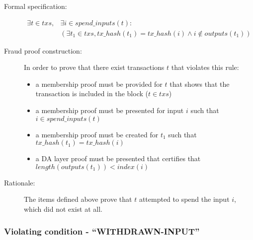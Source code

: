 \documentclass[../midgard.tex]{subfiles}
\begin{document}
\begin{description}

\item[Formal specification:]
\begin{equation*}
\begin{split}
    \exists t \in txs, &\exists i \in spend\_inputs(t): \\
    &( \exists t_1 \in txs, tx\_hash(t_1) = tx\_hash(i) \land i \notin outputs(t_1) )
\end{split}
\end{equation*}

\item[Fraud proof construction:] In order to prove that there exist transactions $t$ that violates this rule:
\begin{itemize}
    \item a membership proof must be provided for $t$ that shows that the transaction is included in the block ($t \in txs$)
    \item a membership proof must be presented for input $i$ such that $i \in spend\_inputs(t)$
    \item a membership proof must be created for $t_1$ such that $tx\_hash(t_1) = tx\_hash(i)$
    \item a DA layer proof must be presented that certifies that $length(outputs(t_1)) < index(i)$ \todo
\end{itemize}

\item[Rationale:] The items defined above prove that $t$ attempted to spend the input $i$, which did not exist at all.

\end{description}

\subsubsection{Violating condition - ``WITHDRAWN-INPUT''}
\label{sec:WITHDRAWN-INPUT}
\end{document}

